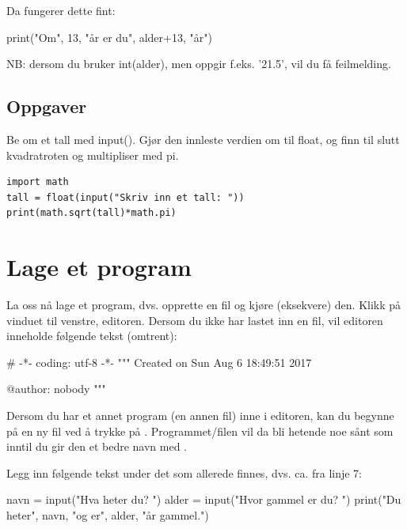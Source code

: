 Da fungerer dette fint: 

\begin{usncodebox}
print("Om", 13, "år er du", alder+13, "år") 
\end{usncodebox}

NB: dersom du bruker int(alder), men oppgir f.eks. '21.5', vil du få feilmelding. 

\subsection{Oppgaver}

\begin{exercise}
Be om et tall med input(). Gjør den innleste verdien om til float, og finn til slutt kvadratroten og multipliser med pi. 
\end{exercise}
\begin{solution}
\begin{lstlisting}
import math
tall = float(input("Skriv inn et tall: "))
print(math.sqrt(tall)*math.pi)
\end{lstlisting}
\end{solution}

\section{Lage et program}

La oss nå lage et program, dvs. opprette en fil og kjøre (eksekvere) den.  Klikk på vinduet til venstre, editoren.  Dersom du ikke har lastet inn en fil, vil editoren inneholde følgende tekst (omtrent): 

\begin{usncodebox}
# -*- coding: utf-8 -*-
"""
Created on Sun Aug  6 18:49:51 2017

@author: nobody
"""
\end{usncodebox}

Dersom du har et annet program (en annen fil) inne i editoren, kan du begynne på en ny fil ved å trykke på \usnsubmenusep{}. Programmet/filen vil da bli hetende noe sånt som  inntil du gir den et bedre navn med \usnsubmenusep{}.

Legg inn følgende tekst under det som allerede finnes, dvs. ca. fra linje 7: 

\begin{usncodebox}
navn = input("Hva heter du? ")
alder = input("Hvor gammel er du? ") 
print("Du heter", navn, "og er", alder, "år gammel.") 
\end{usncodebox}

